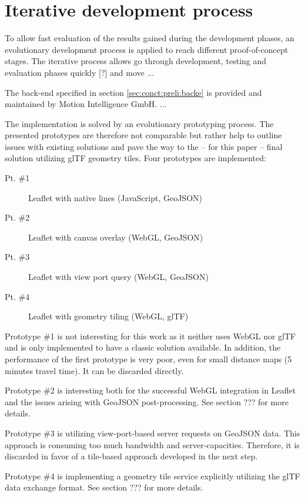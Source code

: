   \section{Iterative development process}
    \label{sec:imple:cycle}
    To allow fast evaluation of the results gained during the development phases, an evolutionary development process is applied to reach different proof-of-concept stages. The iterative process allows go through development, testing and evaluation phases quickly [?] and move ...\par
    The back-end specified in section \ref{sec:conct:preli:backe} is provided and maintained by Motion Intelligence GmbH. ...\par
    The implementation is solved by an evolutionary prototyping process. The presented prototypes are therefore not comparable but rather help to outline issues with existing solutions and pave the way to the -- for this paper -- final solution utilizing glTF geometry tiles. Four prototypes are implemented:
    \begin{description}
      \item[Pt. \#1] Leaflet with native lines (JavaScript, GeoJSON)
      \item[Pt. \#2] Leaflet with canvas overlay (WebGL, GeoJSON)
      \item[Pt. \#3] Leaflet with view port query (WebGL, GeoJSON)
      \item[Pt. \#4] Leaflet with geometry tiling (WebGL, glTF)
    \end{description}
    Prototype \#1 is not interesting for this work as it neither uses WebGL nor glTF and is only implemented to have a classic solution available. In addition, the performance of the first prototype is very poor, even for small distance maps (5 minutes travel time). It can be discarded directly.\par
    Prototype \#2 is interesting both for the successful WebGL integration in Leaflet and the issues arising with GeoJSON post-processing. See section ??? for more details.\par
    Prototype \#3 is utilizing view-port-based server requests on GeoJSON data. This approach is consuming too much bandwidth and server-capacities. Therefore, it is discarded in favor of a tile-based approach developed in the next step.\par
    Prototype \#4 is implementing a geometry tile service explicitly utilizing the glTF data exchange format. See section ??? for more details.
